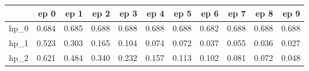 \begin{tabular}{lrrrrrrrrrr}
\toprule
{} &   ep 0 &   ep 1 &   ep 2 &   ep 3 &   ep 4 &   ep 5 &   ep 6 &   ep 7 &   ep 8 &   ep 9 \\
\midrule
hp\_0 &  0.684 &  0.685 &  0.688 &  0.688 &  0.688 &  0.688 &  0.682 &  0.688 &  0.688 &  0.688 \\
hp\_1 &  0.523 &  0.303 &  0.165 &  0.104 &  0.074 &  0.072 &  0.037 &  0.055 &  0.036 &  0.027 \\
hp\_2 &  0.621 &  0.484 &  0.340 &  0.232 &  0.157 &  0.113 &  0.102 &  0.081 &  0.072 &  0.048 \\
\bottomrule
\end{tabular}
